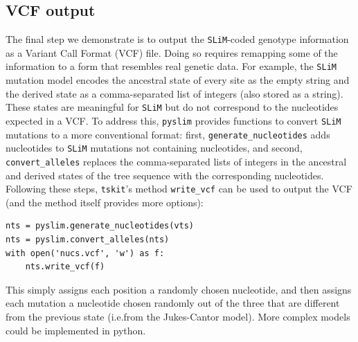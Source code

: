 \documentclass[12pt]{article}
\newcommand{\tskit}[0]{\texttt{tskit}\xspace}
\newcommand{\slim}[0]{\texttt{SLiM}\xspace}
\newcommand{\pyslim}[0]{\texttt{pyslim}\xspace}
\newcommand*{\ie}{i.e.\xcomma}
\begin{document}
\subsection{VCF output}
The final step we demonstrate is to output the \slim-coded genotype information as a Variant Call Format (VCF) file.
Doing so requires remapping some of the information to a form that resembles real genetic data.
For example, the \slim mutation model encodes the ancestral state of every site as the empty string and the derived state
as a comma-separated list of integers (also stored as a string).
These states are meaningful for \slim but do not correspond to the nucleotides expected in a VCF.
To address this, \pyslim provides functions to convert \slim mutations to a more conventional format:
first, \verb|generate_nucleotides| adds nucleotides to \slim mutations not containing nucleotides,
and second, \verb|convert_alleles| replaces the comma-separated lists of integers in the ancestral and derived states of the tree sequence
with the corresponding nucleotides.
Following these steps, \tskit's method \verb|write_vcf| can be used to output the VCF
(and the method itself provides more options):
\begin{verbatim}
nts = pyslim.generate_nucleotides(vts)
nts = pyslim.convert_alleles(nts)
with open('nucs.vcf', 'w') as f:
    nts.write_vcf(f)
\end{verbatim}
This simply assigns each position a randomly chosen nucleotide,
and then assigns each mutation a nucleotide chosen randomly out of the three that are different
from the previous state (\ie from the Jukes-Cantor model).
More complex models could be implemented in python.

\end{document}

